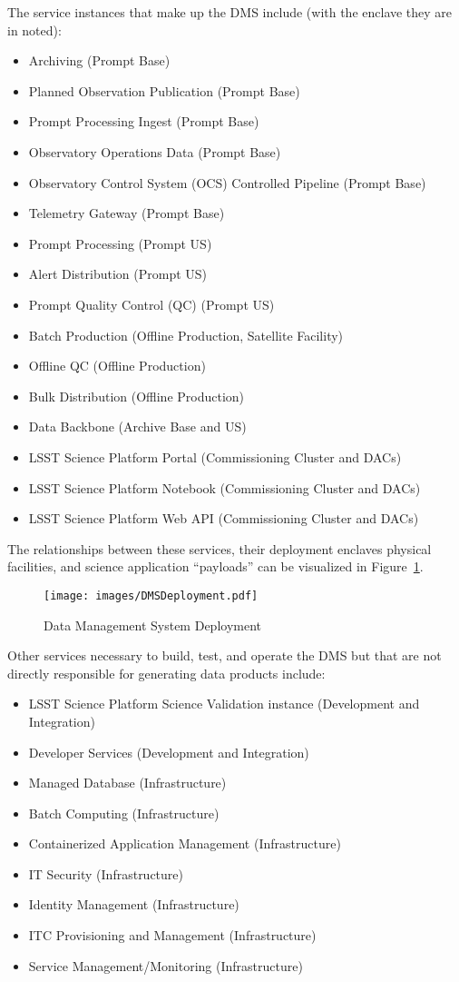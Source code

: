 \documentclass[DM,toc,lsstdraft]{lsstdoc}
\begin{document}
The service instances that make up the DMS include (with the
enclave they are in noted):
\begin{itemize}
\item
  Archiving (Prompt Base)
\item
  Planned Observation Publication (Prompt Base)
\item
  Prompt Processing Ingest (Prompt Base)
\item
  Observatory Operations Data (Prompt Base)
\item
  Observatory Control System (OCS) Controlled Pipeline (Prompt Base)
\item
  Telemetry Gateway (Prompt Base)
\item
  Prompt Processing (Prompt US)
\item
  Alert Distribution (Prompt US)
\item
  Prompt Quality Control (QC) (Prompt US)
\item
  Batch Production (Offline Production, Satellite Facility)
\item
  Offline QC (Offline Production)
\item
  Bulk Distribution (Offline Production)
\item
  Data Backbone (Archive Base and US)
\item
  LSST Science Platform Portal (Commissioning Cluster and DACs)
\item
  LSST Science Platform Notebook (Commissioning Cluster and DACs)
\item
  LSST Science Platform Web API (Commissioning Cluster and DACs)
\end{itemize}

The relationships between these services, their deployment enclaves
physical facilities, and science application ``payloads'' can be
visualized in Figure~\ref{fig:deployment}.

\begin{figure}
\centering
\texttt{[image: images/DMSDeployment.pdf]}
\caption{Data Management System Deployment}
\label{fig:deployment}
\end{figure}

Other services necessary to build, test, and operate the DMS but that are not directly responsible for generating data products include:
\begin{itemize}
\item
  LSST Science Platform Science Validation instance (Development and Integration)
\item
  Developer Services (Development and Integration)
\item
  Managed Database (Infrastructure)
\item
  Batch Computing (Infrastructure)
\item
  Containerized Application Management (Infrastructure)
\item
  IT Security (Infrastructure)
\item
  Identity Management (Infrastructure)
\item
  ITC Provisioning and Management (Infrastructure)
\item
  Service Management/Monitoring (Infrastructure)
\end{itemize}
\end{document}
